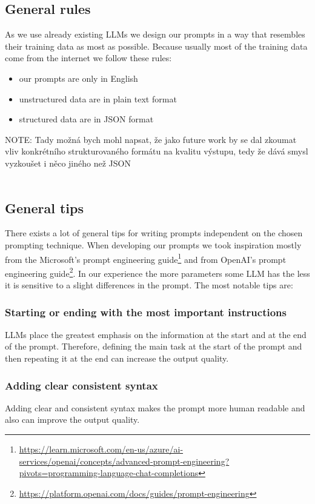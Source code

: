 \subsection{General rules}
As we use already existing LLMs we design our prompts in a way that resembles their training data as most as possible. Because usually most of the training data come from the internet we follow these rules:
\begin{itemize}
\item our prompts are only in English
\item unstructured data are in plain text format
\item structured data are in JSON format \
\end{itemize}

NOTE: Tady možná bych mohl napsat, že jako future work by se dal zkoumat vliv konkrétního strukturovaného formátu na kvalitu výstupu, tedy že dává smysl vyzkoušet i něco jiného než JSON \\~\\


\subsection{General tips}
There exists a lot of general tips for writing prompts independent on the chosen prompting technique.
When developing our prompts we took inspiration mostly from the Microsoft's prompt engineering guide\footnote{\url{https://learn.microsoft.com/en-us/azure/ai-services/openai/concepts/advanced-prompt-engineering?pivots=programming-language-chat-completions}} and from OpenAI's prompt engineering guide\footnote{\url{https://platform.openai.com/docs/guides/prompt-engineering}}. In our experience the more parameters some LLM has the less it is sensitive to a slight differences in the prompt. The most notable tips are:


\subsubsection{Starting or ending with the most important instructions}
LLMs place the greatest emphasis on the information at the start and at the end of the prompt. Therefore, defining the main task at the start of the prompt and then repeating it at the end can increase the output quality.


\subsubsection{Adding clear consistent syntax}
Adding clear and consistent syntax makes the prompt more human readable and also can improve the output quality.


